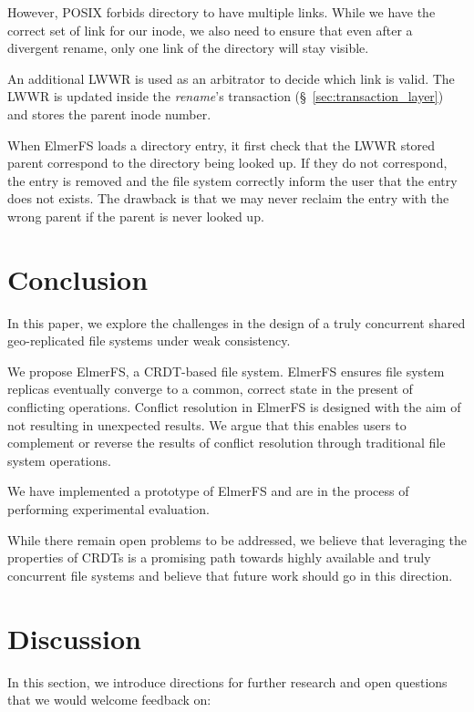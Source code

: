 \documentclass[sigconf, anonymous, 10pt]{acmart}
\begin{document}
However, POSIX forbids directory to have multiple links. While we have the correct set of link
for our inode, we also need to ensure that even after a divergent rename, only one link of the
directory will stay visible.

An additional LWWR is used as an arbitrator to decide which link is valid. The LWWR is updated inside
the \textit{rename}'s transaction (\S~\ref{sec:transaction_layer}) and stores the parent inode number.

When ElmerFS loads a directory entry, it first check that the LWWR stored parent correspond to
the directory being looked up. If they do not correspond, the entry is removed and the file system
correctly inform the user that the entry does not exists. The drawback is that we may never reclaim
the entry with the wrong parent if the parent is never looked up.

\section{Conclusion}

In this paper, we explore the challenges in the design of a truly
concurrent shared geo-replicated file systems under weak consistency.

We propose ElmerFS, a CRDT-based file system.
ElmerFS ensures file system replicas eventually converge to a common,
correct state in the present of conflicting operations.
Conflict resolution in ElmerFS is designed with the aim of
not resulting in unexpected results.
We argue that this enables users to complement or reverse the results of conflict resolution
through traditional file system operations.

We have implemented a prototype of ElmerFS and are in the process of performing
experimental evaluation.

While there remain open problems to be addressed,
we believe that leveraging the properties of CRDTs is a promising path towards
highly available and truly concurrent file systems and believe that future
work should go in this direction.

\section{Discussion}

In this section, we introduce directions for further research and open questions that
we would welcome feedback on:
\end{document}
